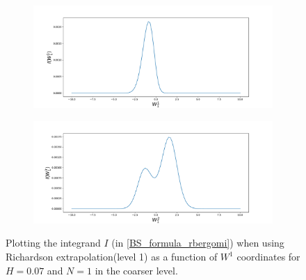 \documentclass[11pt]{article}
\begin{document}
 
 \begin{figure}[h!]
 	\centering
 	\begin{subfigure}{.4\textwidth}
 		\centering
 		\includegraphics[width=1\linewidth]{./figures/integrand_richardson_plotting_rBergomi/N_1/W_1/Bergomi_integrand_rich_level1_K_1_H_007_y1f_N_1}
 		\caption{}
 		\label{fig:sub3}
 	\end{subfigure}%
 	\begin{subfigure}{.4\textwidth}
 		\centering
 		\includegraphics[width=1\linewidth]{./figures/integrand_richardson_plotting_rBergomi/N_1/W_1/Bergomi_integrand_rich_level1_K_1_H_007_y2f_N_1}
 		\caption{}
 		\label{fig:sub4}
 	\end{subfigure}
 	\caption{Plotting the integrand $I$ (in \eqref{BS_formula_rbergomi}) when using Richardson extrapolation(level 1) as a function of $W^1$ coordinates for $H=0.07$ and $N=1$ in the coarser level.}
 	\label{fig:Integrand_rich_level1_H_007_N_1_W_1}
 \end{figure}
 
\end{document}
